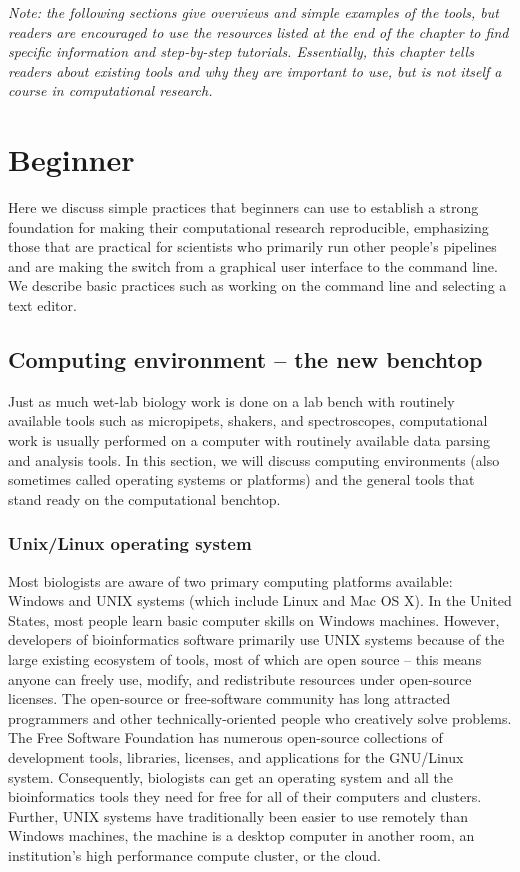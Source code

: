 \documentclass[ChapterTOCs,krantz2]{krantz} %
\begin{document}
\textsl{Note: the following sections give overviews and simple examples of the tools, 
but readers are encouraged to use the resources listed at the end of
the chapter to find specific information and step-by-step tutorials.  Essentially, 
this chapter tells readers about existing tools and why they are important to use, 
but is not itself a course in computational research.}

\section{Beginner} Here we discuss simple practices that beginners can use
to establish a strong foundation for making their computational research
reproducible, emphasizing those that are practical for scientists who primarily
run other people's pipelines and are making the switch from a graphical user
interface to the command line. We describe basic practices such as working
on the command line and selecting a text editor.  

\subsection{Computing environment -- the new benchtop}

Just as much wet-lab biology work is done on a lab bench with routinely available tools
such as micropipets, shakers, and spectroscopes, computational work
is usually performed on a computer with routinely available data parsing and analysis tools.  In this section, we will discuss computing environments (also
sometimes called operating systems or platforms) and the general tools that
stand ready on the computational benchtop.  

\subsubsection{Unix/Linux operating system}


Most biologists are aware of two primary computing platforms available:
Windows and UNIX systems (which include Linux and Mac OS X). 
In the United States, most people
learn basic computer skills on Windows machines.  
However, developers of bioinformatics
software primarily use UNIX systems because of the large existing ecosystem
of tools, most of which are open source -- this means anyone can freely use, modify, and
redistribute resources under open-source licenses.  The open-source or 
free-software community has long attracted programmers and other 
technically-oriented people who creatively solve problems.
The Free Software Foundation\cite{FSF} has numerous 
open-source collections of development
tools, libraries, licenses, and applications for the GNU/Linux system.
Consequently, biologists can get an operating system and all the bioinformatics
tools they need for free for all of their computers and clusters.  
Further, UNIX systems have traditionally been easier to use remotely than Windows
machines,
the machine is a desktop computer 
in another room, an institution's high performance compute cluster, or 
the cloud.
\end{document}
